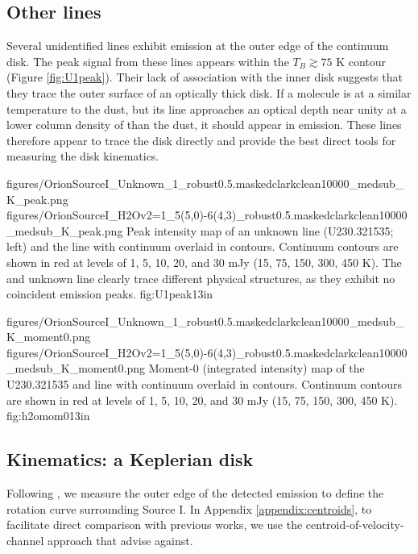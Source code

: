 \documentclass[twocolumn]{aastex61}
\begin{document}
\subsection{Other lines}
Several unidentified lines exhibit emission at the outer edge of the continuum disk.
The peak signal from these lines appears within the $T_B\gtrsim75$ K contour
(Figure \ref{fig:U1peak}).
Their lack of association with the inner disk suggests that they trace the outer
surface of an optically thick disk.
If a molecule is at a similar temperature to the dust, but its line approaches
an optical depth near unity at a lower column density of \hh than the dust,
it should appear in emission.  These lines therefore appear to trace the disk
directly and provide the best direct tools for measuring the disk kinematics.

\FigureTwo
{{figures/OrionSourceI_Unknown_1_robust0.5.maskedclarkclean10000_medsub_K_peak}.png}
{{figures/OrionSourceI_H2Ov2=1_5(5,0)-6(4,3)_robust0.5.maskedclarkclean10000_medsub_K_peak}.png}
{Peak intensity map of an unknown line (U230.321535; left) and the \water
line with continuum overlaid
in contours.  Continuum contours are shown in red at levels of 1, 5, 10, 20, and 30
mJy \perbeam (15, 75, 150, 300, 450 K).
The \water and unknown line clearly trace different physical structures, as
they exhibit no coincident emission peaks.
}
{fig:U1peak}{1}{3in}

\FigureTwo
{{figures/OrionSourceI_Unknown_1_robust0.5.maskedclarkclean10000_medsub_K_moment0}.png}
{{figures/OrionSourceI_H2Ov2=1_5(5,0)-6(4,3)_robust0.5.maskedclarkclean10000_medsub_K_moment0}.png}
{Moment-0 (integrated intensity) map of the U230.321535 and \water line with continuum overlaid
in contours.  Continuum contours are shown in red at levels of 1, 5, 10, 20, and 30
mJy \perbeam (15, 75, 150, 300, 450 K).
}
{fig:h2omom0}{1}{3in}

\subsection{Kinematics: a Keplerian disk}
\label{sec:kinematics}
Following \citet{Seifried2016a}, we measure the outer edge of the detected
emission to define the rotation curve surrounding Source I.  In Appendix
\ref{appendix:centroids}, to facilitate direct comparison with previous works,
we use the centroid-of-velocity-channel approach that \citet{Seifried2016a}
advise against.
\end{document}
